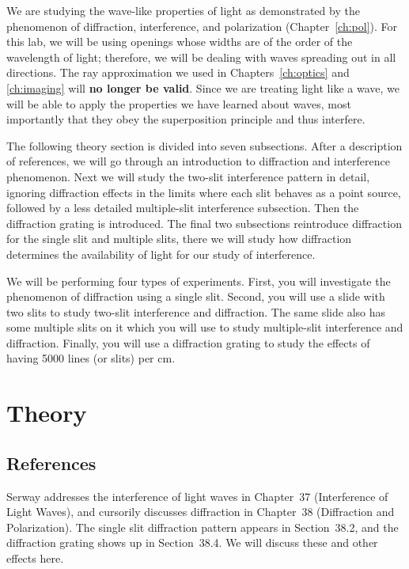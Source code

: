 We are studying the wave-like properties of light as 
demonstrated by the phenomenon of diffraction, interference, and 
polarization (Chapter~\ref{ch:pol}).  For this lab, we will be using openings 
whose widths are of the order of the wavelength of light; therefore,
we will be dealing with waves spreading out in all directions.  The 
ray approximation we used in Chapters~\ref{ch:optics} and \ref{ch:imaging}
will {\bf no longer be 
valid}.   Since we are treating light like a wave, we will be able to 
apply the properties we have learned about waves, most importantly that 
they obey the superposition principle and thus interfere.  

The following theory section is divided into seven subsections. 
After a description of references,  
we will go through an introduction to diffraction and interference 
phenomenon.  Next we will study the two-slit interference pattern in detail,
ignoring diffraction effects in the limits where each slit behaves as a 
point source, followed by a less detailed multiple-slit 
interference subsection.  Then the diffraction grating is introduced.
The final two subsections reintroduce diffraction for the single slit and 
multiple slits, there we will study how diffraction determines the availability
of light for our study of interference.  

We will be performing four types of experiments.  First, you will
investigate the phenomenon of diffraction using a single slit.  Second,
you will use a slide with two slits to study two-slit interference and 
diffraction.  The same slide also has some multiple slits on it which
you will use to study multiple-slit interference and diffraction.  
Finally, you will use a diffraction grating to study the effects of
having 5000 lines (or slits) per cm.    
\\              
\section{Theory}

\subsection{References}

Serway addresses the interference of light waves in Chapter~37 
(Interference of Light Waves), and cursorily discusses diffraction
in Chapter~38 (Diffraction and Polarization). The single slit
diffraction pattern appears in Section~38.2, and the diffraction
grating shows up in Section~38.4. We will discuss these and other
effects here.

